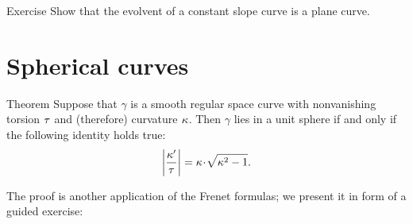 \begin{thm}{Exercise}\label{ex:evolvent-constant-slope}
Show that the evolvent of a constant slope curve is a plane curve.
\end{thm}

\section{Spherical curves}

\begin{thm}{Theorem}
Suppose that $\gamma$ is a smooth regular space curve with nonvanishing torsion $\tau$ and (therefore) curvature $\kappa$.
Then $\gamma$ lies in a unit sphere if and only if 
the following identity holds true:
\[\left|\frac{\kur'}{\tor}\right|=\kur\cdot\sqrt{\kur^2-1}.\]
\end{thm}

The proof is another application of the Frenet formulas;
we present it in form of a guided exercise:

